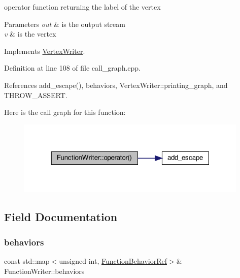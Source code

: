 operator function returning the label of the vertex 


\begin{DoxyParams}{Parameters}
{\em out} & is the output stream \\
\hline
{\em v} & is the vertex \\
\hline
\end{DoxyParams}


Implements \hyperlink{classVertexWriter_a9df92a65d6e59d160be56eb8ec5cb84c}{Vertex\+Writer}.



Definition at line 108 of file call\+\_\+graph.\+cpp.



References add\+\_\+escape(), behaviors, Vertex\+Writer\+::printing\+\_\+graph, and T\+H\+R\+O\+W\+\_\+\+A\+S\+S\+E\+RT.

Here is the call graph for this function\+:
\nopagebreak
\begin{figure}[H]
\begin{center}
\leavevmode
\includegraphics[width=313pt]{d4/d44/classFunctionWriter_af935396f9e2d8a4ac426655ab37bcb39_cgraph}
\end{center}
\end{figure}


\subsection{Field Documentation}
\mbox{\label{classFunctionWriter_aa3a722adfbe6e316629886c0c20fb317}} 
\subsubsection{\texorpdfstring{behaviors}{behaviors}}
{\footnotesize\ttfamily const std\+::map$<$unsigned int, \hyperlink{function__behavior_8hpp_affbc6a46ab86ddfabe31c10986d333dc}{Function\+Behavior\+Ref}$>$\& Function\+Writer\+::behaviors\hspace{0.3cm}{\ttfamily [private]}}



